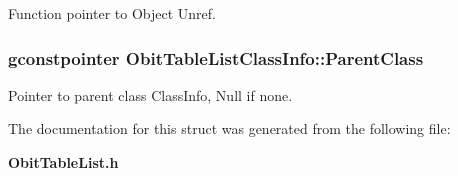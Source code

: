 Function pointer to Object Unref. 

\subsubsection{\setlength{\rightskip}{0pt plus 5cm}gconstpointer {\bf Obit\-Table\-List\-Class\-Info::Parent\-Class}}\label{structObitTableListClassInfo_o3}


Pointer to parent class Class\-Info, Null if none. 



The documentation for this struct was generated from the following file:\begin{CompactItemize}
\item 
{\bf Obit\-Table\-List.h}\end{CompactItemize}
